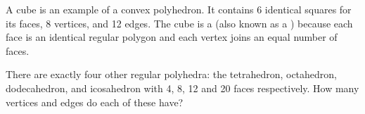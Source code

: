 \documentclass{book}
\begin{document}
\setcounter{cpjt}{32}
\addtocounter{cpjt}{-1}
\begin{activity}\label{activity-27}
\hypertarget{p-297}{}%
A cube is an example of a convex polyhedron. It contains 6 identical squares for its faces, 8 vertices, and 12 edges. The cube is a  (also known as a ) because each face is an identical regular polygon and each vertex joins an equal number of faces.%
\par
\hypertarget{p-298}{}%
There are exactly four other regular polyhedra: the tetrahedron, octahedron, dodecahedron, and icosahedron with 4, 8, 12 and 20 faces respectively. How many vertices and edges do each of these have?%
\end{activity}

\clearpage
\end{document}
